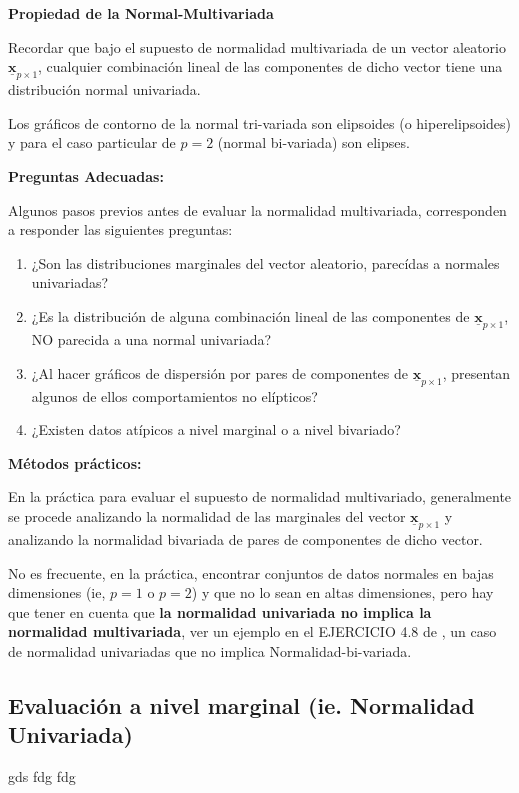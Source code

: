 \documentclass[
]{book}
\theoremstyle{definition}
\theoremstyle{definition}
\theoremstyle{definition}
\theoremstyle{definition}
\theoremstyle{remark}
\begin{document}
\textbf{Propiedad de la Normal-Multivariada}

Recordar que bajo el supuesto de normalidad multivariada de un vector aleatorio \(\underline{\mathbf{x}}_{p\times 1}\), cualquier combinación lineal de las componentes de dicho vector tiene una distribución normal univariada.

Los gráficos de contorno de la normal tri-variada son elipsoides (o hiperelipsoides) y para el caso particular de \(p=2\) (normal bi-variada) son elipses.

\textbf{Preguntas Adecuadas:}

Algunos pasos previos antes de evaluar la normalidad multivariada, corresponden a responder las siguientes preguntas:

\begin{enumerate}
\def\labelenumi{\arabic{enumi}.}
\item
  ¿Son las distribuciones marginales del vector aleatorio, parecídas a normales univariadas?
\item
  ¿Es la distribución de alguna combinación lineal de las componentes de \(\underline{\mathbf{x}}_{p\times 1}\), NO parecida a una normal univariada?
\item
  ¿Al hacer gráficos de dispersión por pares de componentes de
  \(\underline{\mathbf{x}}_{p\times 1}\), presentan algunos de ellos comportamientos no elípticos?
\item
  ¿Existen datos atípicos a nivel marginal o a nivel bivariado?
\end{enumerate}

\textbf{Métodos prácticos:}

En la práctica para evaluar el supuesto de normalidad multivariado, generalmente se procede analizando la normalidad de las marginales del vector \(\underline{\mathbf{x}}_{p\times 1}\) y analizando la normalidad bivariada de pares de componentes de dicho vector.

No es frecuente, en la práctica, encontrar conjuntos de datos normales en bajas dimensiones (ie, \(p=1\) o \(p=2\)) y que no lo sean en altas dimensiones, pero hay que tener en cuenta que \textbf{la normalidad univariada no implica la normalidad multivariada}, ver un ejemplo en el EJERCICIO 4.8 de \citep{johnson2007applied}, un caso de normalidad univariadas que no implica Normalidad-bi-variada.

\hypertarget{evaluaciuxf3n-a-nivel-marginal-ie.-normalidad-univariada}{%
\subsection{Evaluación a nivel marginal (ie. Normalidad Univariada)}\label{evaluaciuxf3n-a-nivel-marginal-ie.-normalidad-univariada}}

gds fdg fdg

  

\backmatter
\printindex
\end{document}

